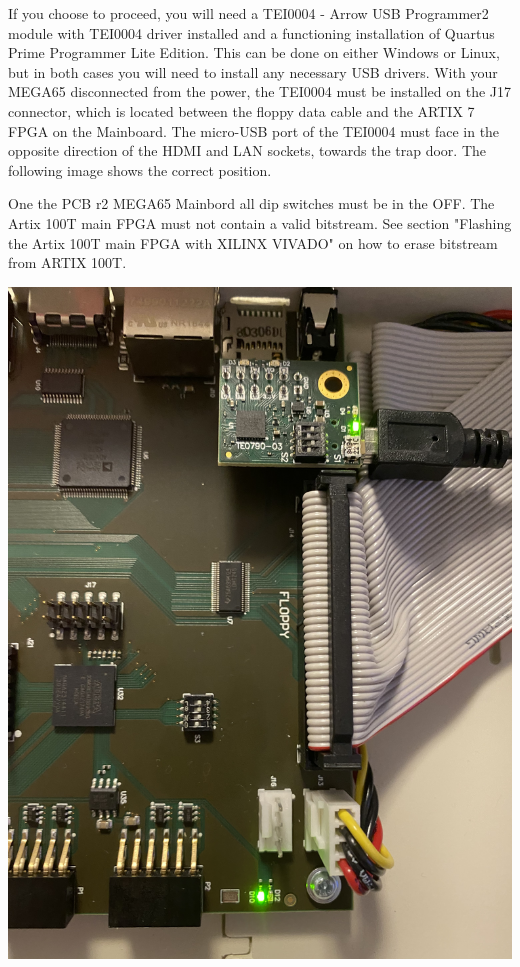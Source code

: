 If you choose to proceed, you will need a TEI0004 - Arrow USB Programmer2 module with TEI0004 driver installed
and a functioning installation of Quartus Prime Programmer Lite Edition.  This can be done on either Windows
or Linux, but in both cases you will need to install any necessary USB drivers.
With your MEGA65 disconnected from the power, the TEI0004 must be installed on the J17 connector,
which is located between the floppy data cable and the ARTIX 7 FPGA on the Mainboard.
The micro-USB port of the TEI0004 must face in the opposite direction of the HDMI and LAN sockets, towards
the trap door.
The following image shows the correct position.

One the PCB r2 MEGA65 Mainbord all dip switches must be in the OFF. The Artix 100T main FPGA must not contain
a valid bitstream. See section "Flashing the Artix 100T main FPGA with XILINX VIVADO" on how to erase bitstream
from ARTIX 100T. 

\includegraphics[width=\linewidth]{images/jtag_detail_05.jpg}

